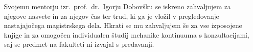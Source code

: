 Svojemu mentorju izr.~prof.~dr.~Igorju Dobovšku se iskreno zahvaljujem za
njegove nasvete in za njegov čas ter trud, ki ga je vložil v pregledovanje
nastajajočega magistrskega dela. Hkrati se mu zahvaljujem še za vse izposojene knjige in za omogočen
individualen študij mehanike kontinuuma s konzultacijami, saj se predmet na fakulteti
ni izvajal s predavanji.